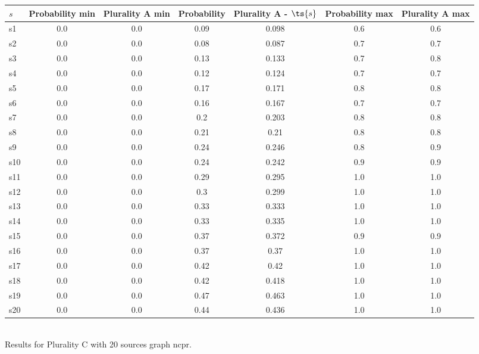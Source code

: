 \documentclass{article}
\begin{document}
\noindent\begin{tabular}{|l|c|c|c|c|c|c|}
\hline
$s$& Probability min & Plurality A min & Probability & Plurality A - $\ts{s}$ & Probability max & Plurality A max\\
\hline
s1 &0.0 & 0.0 & 0.09 & 0.098 & 0.6 & 0.6\\
\hline
s2 &0.0 & 0.0 & 0.08 & 0.087 & 0.7 & 0.7\\
\hline
s3 &0.0 & 0.0 & 0.13 & 0.133 & 0.7 & 0.8\\
\hline
s4 &0.0 & 0.0 & 0.12 & 0.124 & 0.7 & 0.7\\
\hline
s5 &0.0 & 0.0 & 0.17 & 0.171 & 0.8 & 0.8\\
\hline
s6 &0.0 & 0.0 & 0.16 & 0.167 & 0.7 & 0.7\\
\hline
s7 &0.0 & 0.0 & 0.2 & 0.203 & 0.8 & 0.8\\
\hline
s8 &0.0 & 0.0 & 0.21 & 0.21 & 0.8 & 0.8\\
\hline
s9 &0.0 & 0.0 & 0.24 & 0.246 & 0.8 & 0.9\\
\hline
s10 &0.0 & 0.0 & 0.24 & 0.242 & 0.9 & 0.9\\
\hline
s11 &0.0 & 0.0 & 0.29 & 0.295 & 1.0 & 1.0\\
\hline
s12 &0.0 & 0.0 & 0.3 & 0.299 & 1.0 & 1.0\\
\hline
s13 &0.0 & 0.0 & 0.33 & 0.333 & 1.0 & 1.0\\
\hline
s14 &0.0 & 0.0 & 0.33 & 0.335 & 1.0 & 1.0\\
\hline
s15 &0.0 & 0.0 & 0.37 & 0.372 & 0.9 & 0.9\\
\hline
s16 &0.0 & 0.0 & 0.37 & 0.37 & 1.0 & 1.0\\
\hline
s17 &0.0 & 0.0 & 0.42 & 0.42 & 1.0 & 1.0\\
\hline
s18 &0.0 & 0.0 & 0.42 & 0.418 & 1.0 & 1.0\\
\hline
s19 &0.0 & 0.0 & 0.47 & 0.463 & 1.0 & 1.0\\
\hline
s20 &0.0 & 0.0 & 0.44 & 0.436 & 1.0 & 1.0\\
\hline
\end{tabular}\\

\noindent Results for Plurality C with 20 sources graph ncpr.
\end{document}
